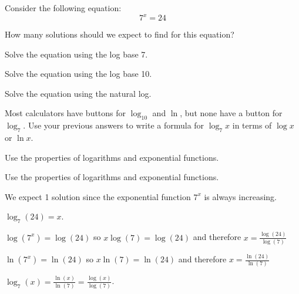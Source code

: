 \begin{activity}\label{A:0.4.3}
    Consider the following equation:
	\[
		7^{x} = 24
	\]

	\ba
		\item How many solutions should we expect to find for this equation?
		\item Solve the equation using the log base 7.
		\item Solve the equation using the log base 10.
		\item Solve the equation using the natural log.
		\item Most calculators have buttons for $\log_{10}$ and $\ln$, but none have a button for $\log_{7}$. Use your previous answers to write a formula for $\log_{7}x$ in terms of 					$\log x$ or $\ln x$.
	\ea

\end{activity}
\begin{smallhint}
   Use the properties of logarithms and exponential functions. 
\end{smallhint}
\begin{bighint}
   Use the properties of logarithms and exponential functions. 
\end{bighint}
\begin{activitySolution}
   \ba
    \item We expect 1 solution since the exponential function $7^x$ is always increasing.
    \item $\log_7 (24) = x$.
    \item $\log (7^x) = \log(24)$ so $x\log(7) = \log(24)$ and therefore $x =
        \frac{\log(24)}{\log(7)}$
    \item $\ln (7^x) = \ln(24)$ so $x\ln(7) = \ln(24)$ and therefore $x =
        \frac{\ln(24)}{\ln(7)}$
    \item $\log_7(x) = \frac{\ln(x)}{\ln(7)} = \frac{\log(x)}{\log(7)}$.
   \ea
\end{activitySolution}

\aftera
